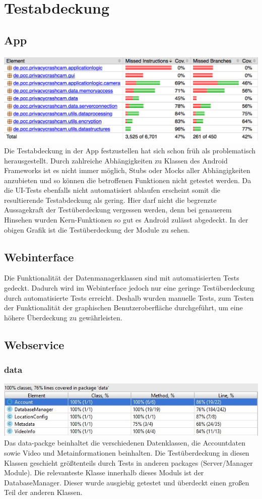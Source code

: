 \chapter{Testabdeckung}
\section{App}
\includegraphics[scale=0.6]{resources/coverage/app/Coverage.jpg}
Die Testabdeckung in der App festzustellen hat sich schon früh als problematisch herausgestellt. Durch zahlreiche Abhängigkeiten zu Klassen des Android Frameworks ist es nicht immer möglich, Stubs oder Mocks aller Abhängigkeiten anzubieten und so können die betroffenen Funktionen nicht getestet werden. Da die UI-Tests ebenfalls nicht automatisiert ablaufen erscheint somit die resultierende Testabdeckung als gering. Hier darf nicht die begrenzte Aussagekraft der Testüberdeckung vergessen werden, denn bei genauerem Hinsehen wurden Kern-Funktionen so gut es Android zulässt abgedeckt. In der obigen Grafik ist die Testüberdeckung der Module zu sehen.

\section{Webinterface}
Die Funktionalität der Datenmanagerklassen sind mit automatisierten Tests gedeckt. Dadurch wird im Webinterface jedoch nur eine geringe Testüberdeckung durch automatisierte Tests erreicht. Deshalb wurden manuelle Tests, zum Testen der Funktionalität der graphischen Benutzeroberfläche durchgeführt, um eine höhere Überdeckung zu gewährleisten.

\section{Webservice}
\subsection{data}
\includegraphics[scale=0.8]{resources/data.jpg}
Das data-packge beinhaltet die verschiedenen Datenklassen, die Accountdaten sowie Video und Metainformationen beinhalten. Die Testüberdeckung in diesen Klassen geschieht größtenteils durch Tests in anderen packages (Server/Manager Module). Die relevanteste Klasse innerhalb dieses Moduls ist der DatabaseManager. Dieser wurde ausgiebig getestet und überdeckt einen großen Teil der anderen  Klassen.
